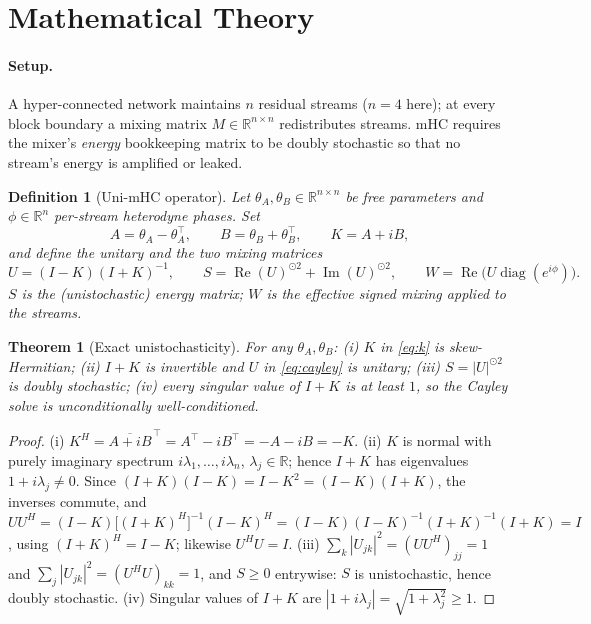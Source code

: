 \documentclass{article}
\newtheorem{theorem}{Theorem}
\newtheorem{definition}{Definition}
\begin{document}
\section{Mathematical Theory}
\label{sec:theory}

\paragraph{Setup.} A hyper-connected network maintains $n$ residual streams
($n=4$ here); at every block boundary a mixing matrix $M\in\mathbb{R}^{n\times n}$
redistributes streams. mHC requires the mixer's \emph{energy} bookkeeping matrix
to be doubly stochastic so that no stream's energy is amplified or leaked.

\begin{definition}[Uni-mHC operator]
\label{def:unimhc}
Let $\theta_A,\theta_B\in\mathbb{R}^{n\times n}$ be free parameters and
$\phi\in\mathbb{R}^n$ per-stream heterodyne phases. Set
\begin{equation}
A = \theta_A - \theta_A^{\!\top}, \qquad
B = \theta_B + \theta_B^{\!\top}, \qquad
K = A + iB ,
\label{eq:k}
\end{equation}
and define the unitary and the two mixing matrices
\begin{equation}
U = (I - K)(I + K)^{-1}, \qquad
S = \operatorname{Re}(U)^{\odot 2} + \operatorname{Im}(U)^{\odot 2}, \qquad
W = \operatorname{Re}\!\big(U \operatorname{diag}(e^{i\phi})\big).
\label{eq:cayley}
\end{equation}
$S$ is the (unistochastic) energy matrix; $W$ is the effective signed mixing
applied to the streams.
\end{definition}

\begin{theorem}[Exact unistochasticity]
\label{thm:unistochastic}
For any $\theta_A,\theta_B$: (i) $K$ in \eqref{eq:k} is skew-Hermitian;
(ii) $I+K$ is invertible and $U$ in \eqref{eq:cayley} is unitary; (iii)
$S=|U|^{\odot 2}$ is doubly stochastic; (iv) every singular value of $I+K$ is at
least $1$, so the Cayley solve is unconditionally well-conditioned.
\end{theorem}

\begin{proof}
(i) $K^{H} = \overline{A+iB}^{\,\top} = A^{\!\top} - iB^{\!\top} = -A - iB = -K$.
(ii) $K$ is normal with purely imaginary spectrum $i\lambda_1,\dots,i\lambda_n$,
$\lambda_j\in\mathbb{R}$; hence $I+K$ has eigenvalues $1+i\lambda_j \neq 0$.
Since $(I+K)(I-K) = I - K^{2} = (I-K)(I+K)$, the inverses commute, and
$UU^{H} = (I-K)\big[(I+K)^{H}\big]^{-1}(I-K)^{H} = (I-K)(I-K)^{-1}(I+K)^{-1}(I+K) = I$,
using $(I+K)^{H} = I-K$; likewise $U^{H}U = I$.
(iii) $\sum_{k}|U_{jk}|^{2} = (UU^{H})_{jj} = 1$ and
$\sum_{j}|U_{jk}|^{2} = (U^{H}U)_{kk} = 1$, and $S\ge 0$ entrywise: $S$ is
unistochastic, hence doubly stochastic.
(iv) Singular values of $I+K$ are $|1+i\lambda_j| = \sqrt{1+\lambda_j^2}\ge 1$.
\end{proof}
\end{document}
